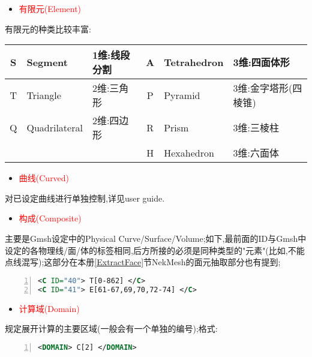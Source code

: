 \begin{itemize}
	\item{\textcolor{red}{有限元(Element)}}
\end{itemize}
\par
有限元的种类比较丰富:\par
\noindent
\begin{tabular}{|c|l|l||c|l|l|}
	\hline 
	S & Segment       & 1维:线段分割 & A & Tetrahedron & 3维:四面体形 \\ 
	\hline 
	T & Triangle      & 2维:三角形   & P & Pyramid     & 3维:金字塔形(四棱锥)\\ 
	\hline 
	Q & Quadrilateral & 2维:四边形   & R & Prism       & 3维:三棱柱\\ 
	\hline
	  &               &             & H & Hexahedron  & 3维:六面体\\ 
	\hline 
\end{tabular} 



\begin{itemize}
	\item{\textcolor{red}{曲线(Curved)}}
\end{itemize}
\par
对已设定曲线进行单独控制,详见user guide.\par



\begin{itemize} \label{Composite}
	\item{\textcolor{red}{构成(Composite)}}
\end{itemize}
\par
主要是Gmsh设定中的Physical Curve/Surface/Volume;如下,最前面的ID与Gmsh中设定的各物理线/面/体的标签相同,后方所接的必须是同种类型的"元素"(比如,不能点线混写);这部分在本册\ref{ExtractFace}节NekMesh的面元抽取部分也有提到;\par
\begin{lstlisting}[frame=single,numbers=left,language=XML]
<C ID="40"> T[0-862] </C>
<C ID="41"> E[61-67,69,70,72-74] </C>
\end{lstlisting}
\par



\begin{itemize}
	\item{\textcolor{red}{计算域(Domain)}}
\end{itemize}

规定展开计算的主要区域(一般会有一个单独的编号);格式:\par
\begin{lstlisting}[frame=single,numbers=left,language=XML]
<DOMAIN> C[2] </DOMAIN>
\end{lstlisting}
\par

